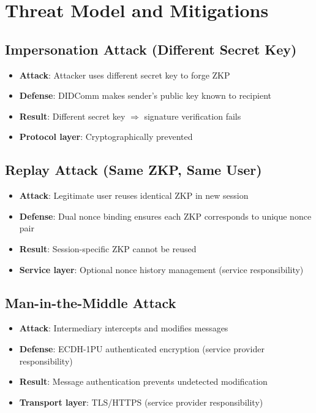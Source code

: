 \section{Threat Model and Mitigations}

\subsection{Impersonation Attack (Different Secret Key)}

\begin{itemize}
  \item \textbf{Attack}: Attacker uses different secret key to forge ZKP
  \item \textbf{Defense}: DIDComm makes sender's public key known to recipient
  \item \textbf{Result}: Different secret key $\Rightarrow$ signature verification fails
  \item \textbf{Protocol layer}: Cryptographically prevented
\end{itemize}

\subsection{Replay Attack (Same ZKP, Same User)}

\begin{itemize}
  \item \textbf{Attack}: Legitimate user reuses identical ZKP in new session
  \item \textbf{Defense}: Dual nonce binding ensures each ZKP corresponds to unique nonce pair
  \item \textbf{Result}: Session-specific ZKP cannot be reused
  \item \textbf{Service layer}: Optional nonce history management (service responsibility)
\end{itemize}

\subsection{Man-in-the-Middle Attack}

\begin{itemize}
  \item \textbf{Attack}: Intermediary intercepts and modifies messages
  \item \textbf{Defense}: ECDH-1PU authenticated encryption (service provider responsibility)
  \item \textbf{Result}: Message authentication prevents undetected modification
  \item \textbf{Transport layer}: TLS/HTTPS (service provider responsibility)
\end{itemize}

